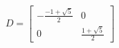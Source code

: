 \documentclass[preview]{standalone}
\begin{document}
\begin{center}
$$D = \begin{bmatrix} - \frac{-1 + \sqrt{5}}{2} &  0 \\ 0 & \frac{1 + \sqrt{5}}{2} \end{bmatrix}$$
\end{center}
\end{document}
